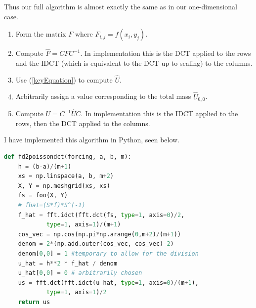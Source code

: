 \documentclass[12pt]{article}
\begin{document}
Thus our full algorithm is almost exactly the same as in our one-dimensional case.
\begin{enumerate}
	\item Form the matrix $F$ where $F_{i,j} = f(x_i, y_j)$.
	\item Compute $\hat{F} = CFC^{-1}$. In implementation this is the DCT applied to the rows and the IDCT (which is equivalent to the DCT up to scaling) to the columns. 
	\item Use (\ref{keyEquation}) to compute $\hat{U}$.
	\item Arbitrarily assign a value corresponding to the total mass $\hat{U}_{0,0}$.
	\item Compute $U = C^{-1}\hat{U}C$. In implementation this is the IDCT applied to the rows, then the DCT applied to the columns.
\end{enumerate}
I have implemented this algorithm in Python, seen below.

\begin{lstlisting}[language=Python]
def fd2poissondct(forcing, a, b, m):
	h = (b-a)/(m+1)
	xs = np.linspace(a, b, m+2)
	X, Y = np.meshgrid(xs, xs)
	fs = foo(X, Y)
	# fhat=(S*f)*S^(-1)
	f_hat = fft.idct(fft.dct(fs, type=1, axis=0)/2,
			type=1, axis=1)/(m+1)
	cos_vec = np.cos(np.pi*np.arange(0,m+2)/(m+1))
	denom = 2*(np.add.outer(cos_vec, cos_vec)-2)
	denom[0,0] = 1 #temporary to allow for the division
	u_hat = h**2 * f_hat / denom
	u_hat[0,0] = 0 # arbitrarily chosen
	us = fft.dct(fft.idct(u_hat, type=1, axis=0)/(m+1),
			type=1, axis=1)/2
	return us
\end{lstlisting}
\end{document}

